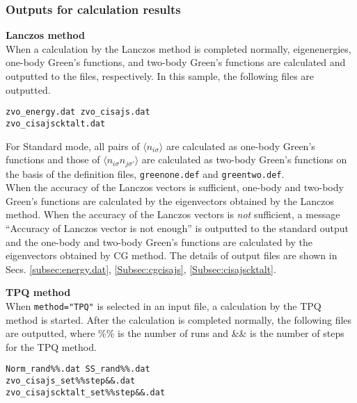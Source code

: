 \subsubsection{Outputs for calculation results}
\begin{description}
\item {\bf Lanczos method}\\
  When a calculation by the Lanczos method is completed normally,
  eigenenergies, one-body Green's functions, and two-body Green's functions
  are calculated and outputted to the files, respectively.
  In this sample, the following files are outputted.\\

\begin{minipage}{12cm}
\begin{screen}
\begin{verbatim}
zvo_energy.dat zvo_cisajs.dat 
zvo_cisajscktalt.dat  
\end{verbatim}
\end{screen}
\end{minipage}

For Standard mode, all pairs of $\langle n_{i\sigma} \rangle$ are calculated
as one-body Green's functions and those of $\langle n_{i\sigma} n_{j\sigma'} \rangle$
are calculated as two-body Green's functions on the basis of the definition files,
\verb|greenone.def| and \verb|greentwo.def|. \\
When the accuracy of the Lanczos vectors is sufficient,
one-body and two-body Green's functions are calculated by the eigenvectors
obtained by the Lanczos method.
When the accuracy of the Lanczos vectors is {\it not} sufficient,
a message ``Accuracy of Lanczos vector is not enough'' is outputted
to the standard output and the one-body and two-body Green's functions
are calculated by the eigenvectors obtained by CG method.
The details of output files are shown in
Secs. \ref{subsec:energy.dat}, \ref{Subsec:cgcisajs}, \ref{Subsec:cisajscktalt}.

\item {\bf TPQ method}\\
  When \verb|method="TPQ"| is selected in an input file,
  a calculation by the TPQ method is started.
  After the calculation is completed normally, the following files are outputted,
  where \%\% is the number of runs and \&\& is the number of steps for the TPQ method.\\
\begin{minipage}{14cm}
\begin{screen}
\begin{verbatim}
Norm_rand%%.dat SS_rand%%.dat
zvo_cisajs_set%%step&&.dat  
zvo_cisajscktalt_set%%step&&.dat  
\end{verbatim}
\end{screen}
\end{minipage}


\end{description}
